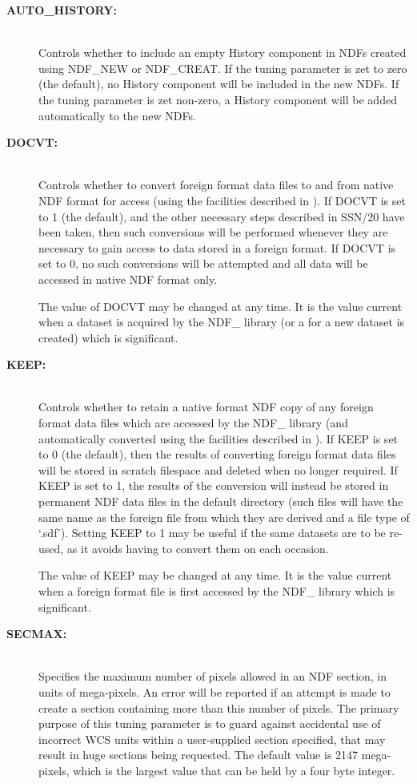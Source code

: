 \documentclass[twoside,11pt,nolof]{starlink}
\begin{document}
\begin{description}

\item[\textbf{AUTO\_HISTORY:}]\mbox{}\\
Controls whether to include an empty History component in NDFs created
using NDF\_NEW or NDF\_CREAT. If the tuning parameter is zet to zero (the
default), no History component will be included in the new NDFs. If the
tuning parameter is zet non-zero, a History component will be added
automatically to the new NDFs.

\item[\textbf{DOCVT:}]\mbox{}\\
Controls whether to convert foreign format data files to and from
native NDF format for access (using the facilities described in
). If DOCVT is set to 1 (the default), and the
other necessary steps described in SSN/20 have been taken, then such
conversions will be performed whenever they are necessary to gain
access to data stored in a foreign format. If DOCVT is set to 0, no
such conversions will be attempted and all data will be accessed in
native NDF format only.

The value of DOCVT may be changed at any time. It is the value current
when a dataset is acquired by the NDF\_ library (or a
 for a new dataset is created)
which is significant.

\item[\textbf{KEEP:}]\mbox{}\\
Controls whether to retain a native format NDF copy of any foreign
format data files which are accessed by the NDF\_ library (and
automatically converted using the facilities described in
). If
KEEP is set to 0 (the default), then the results of converting foreign
format data files will be stored in scratch filespace and deleted when
no longer required. If KEEP is set to 1, the results of the conversion
will instead be stored in permanent NDF data files in the default
directory (such files will have the same name as the foreign file from
which they are derived and a file type of `.sdf'). Setting
KEEP to 1 may be useful if the same datasets are to be re-used, as it
avoids having to convert them on each occasion.

The value of KEEP may be changed at any time. It is the value current
when a foreign format file is first accessed by the NDF\_ library
which is significant.

\item[\textbf{SECMAX:}]\mbox{}\\
Specifies the maximum number of pixels allowed in an NDF section, in
units of mega-pixels. An error will be reported if an attempt is made to
create a section containing more than this number of pixels. The primary
purpose of this tuning parameter is to guard against accidental use of
incorrect WCS units within a user-supplied section specified, that may
result in huge sections being requested. The default value is 2147
mega-pixels, which is the largest value that can be held by a four byte
integer.


\end{description}
\end{document}
